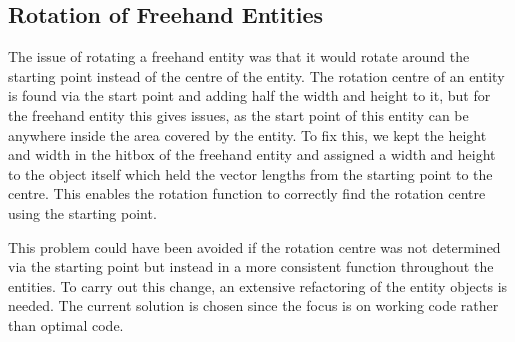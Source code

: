 \subsection{Rotation of Freehand Entities}
The issue of rotating a freehand entity was that it would rotate around the starting point instead of the centre of the entity.
The rotation centre of an entity is found via the start point and adding half the width and height to it, but for the freehand entity this gives issues, as the start point of this entity can be anywhere inside the area covered by the entity.
To fix this, we kept the height and width in the hitbox of the freehand entity and assigned a width and height to the object itself which held the vector lengths from the starting point to the centre.
This enables the rotation function to correctly find the rotation centre using the starting point.

This problem could have been avoided if the rotation centre was not determined via the starting point but instead in a more consistent function throughout the entities.
To carry out this change, an extensive refactoring of the entity objects is needed.
The current solution is chosen since the focus is on working code rather than optimal code.


